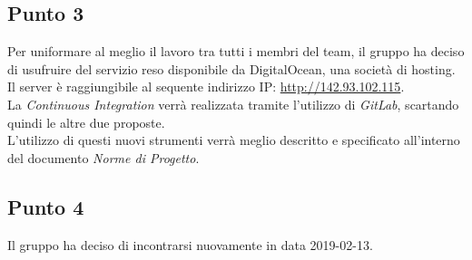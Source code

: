 \subsection{Punto 3}
Per uniformare al meglio il lavoro tra tutti i membri del team, il gruppo ha deciso di usufruire del servizio reso disponibile da DigitalOcean, una società di hosting. \\
Il server è raggiungibile al sequente indirizzo IP: \url{http://142.93.102.115}. \\
La \textit{Continuous Integration} verrà realizzata tramite l'utilizzo di \textit{GitLab}\glossario, scartando quindi le altre due proposte. \\ 
L'utilizzo di questi nuovi strumenti verrà meglio descritto e specificato all'interno del documento \textit{Norme di Progetto}.\\

\subsection{Punto 4}
Il gruppo ha deciso di incontrarsi nuovamente in data 2019-02-13.